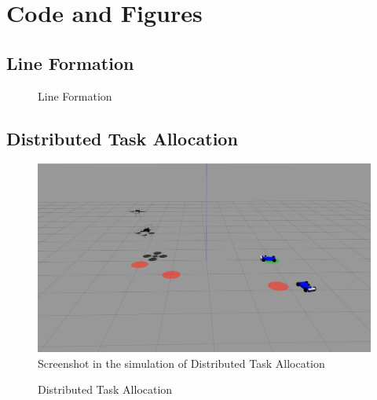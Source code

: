 
\section{Code and Figures}

\subsection{Line Formation}

\begin{figure}[h!]
    

    \caption{Line Formation}
\end{figure}


\subsection{Distributed Task Allocation}


\begin{figure}[h!]
    \includegraphics[width=\columnwidth]{figs/taskalloc_w_marker.png}

    \caption{Screenshot in the simulation of Distributed Task Allocation}
\end{figure}

\begin{figure}[t]
    {
    
    }
    {
    
    }

    \caption{Distributed Task Allocation}
\end{figure}
